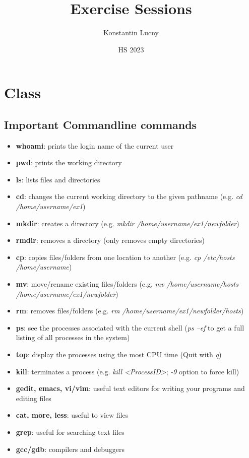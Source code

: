 \documentclass[a4paper,10pt]{article}
\title{Exercise Sessions}
\author{Konstantin Lucny}
\date{HS 2023}
\begin{document}
\maketitle
\section{Class}
\subsection{Important Commandline commands}
\begin{itemize}
    \item \textbf{whoami}: prints the login name of the current user
    \item \textbf{pwd}: prints the working directory
    \item \textbf{ls}: lists files and directories
    \item \textbf{cd}: changes the current working directory to the given pathname (e.g. \textit{cd /home/username/ex1})
    \item \textbf{mkdir}: creates a directory (e.g. \textit{mkdir /home/username/ex1/newfolder})
    \item \textbf{rmdir}: removes a directory (only removes empty directories)
    \item \textbf{cp}: copies files/folders from one location to another (e.g. \textit{cp /etc/hosts /home/username})
    \item \textbf{mv}: move/rename existing files/folders (e.g. \textit{mv /home/username/hosts /home/username/ex1/newfolder})
    \item \textbf{rm}: removes files/folders (e.g. \textit{rm /home/username/ex1/newfolder/hosts})
    \item \textbf{ps}: see the processes associated with the current shell (\textit{ps –ef} to get a full listing of all processes in the system)
    \item \textbf{top}: display the processes using the most CPU time (Quit with \textit{q})
    \item \textbf{kill}: terminates a process (e.g. \textit{kill <ProcessID>}; \textit{-9} option to force kill)
    \item \textbf{gedit, emacs, vi/vim}: useful text editors for writing your programs and editing files
    \item \textbf{cat, more, less}: useful to view files
    \item \textbf{grep}: useful for searching text files
    \item \textbf{gcc/gdb}: compilers and debuggers
    

\end{itemize}
\end{document}
